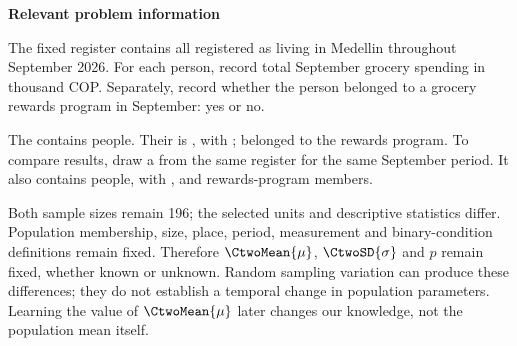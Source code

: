 \secInicio[][sec:p1]

\clearpage



\textbf{Relevant problem information}

\begin{probleminfoexcerpt}
The fixed register contains all    registered as living in Medellin throughout September 2026. For each person, record total September grocery spending in thousand COP. Separately, record whether the person belonged to a grocery rewards program in September: yes or no.
\end{probleminfoexcerpt}

\begin{probleminfoexcerpt}
The     contains  people. Their    is   , with      ;  belonged to the rewards program. To compare results, draw a     from the same register for the same September period. It also contains  people, with      ,       and  rewards-program members.
\end{probleminfoexcerpt}



Both sample sizes remain 196; the selected units and descriptive statistics differ. Population membership, size, place, period, measurement and binary-condition definitions remain fixed. Therefore $\CtwoMean{\mu}$, $\CtwoSD{\sigma}$ and $p$ remain fixed, whether known or unknown. Random sampling variation can produce these differences; they do not establish a temporal change in population parameters. Learning the value of $\CtwoMean{\mu}$ later changes our knowledge, not the population mean itself.

